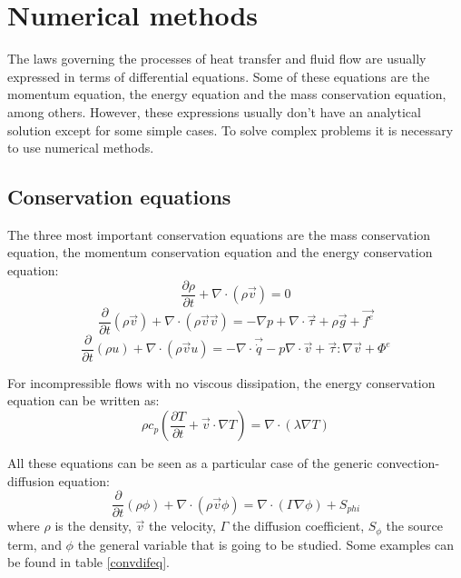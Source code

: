 \chapter{Numerical methods}

The laws governing the processes of heat transfer and fluid flow are usually expressed in terms of differential equations. Some of these equations are the momentum equation, the energy equation and the mass conservation equation, among others. However, these expressions usually don’t have an analytical solution except for some simple cases. To solve complex problems it is necessary to use numerical methods.

\section{Conservation equations}
The three most important conservation equations are the mass conservation equation, the momentum conservation equation and the energy conservation equation:
\begin{equation}
\frac{\partial\rho}{\partial t}+\nabla\cdot\left(\rho\vec{v}\right)=0
\end{equation}
\begin{equation}
\frac{\partial}{\partial t}\left(\rho\vec{v}\right)+\nabla\cdot\left(\rho\vec{v}\vec{v}\right)=-\nabla p+\nabla\cdot\vec{\tau}+\rho\vec{g}+\vec{f^{e}}
\end{equation}
\begin{equation}
\frac{\partial}{\partial t}(\rho u)+\nabla\cdot\left(\rho\vec{v}u\right)=-\nabla\cdot\vec{\dot{q}}-p\nabla\cdot\vec{v}+\vec{\tau}:\nabla\vec{v}+\Phi^{e}
\end{equation}

For incompressible flows with no viscous dissipation, the energy conservation equation can be written as:
\begin{equation}
\rho c_{p}\left(\frac{\partial T}{\partial t}+\vec{v}\cdot\nabla T\right)=\nabla\cdot\left(\lambda\nabla T\right)
\end{equation}

All these equations can be seen as a particular case of the generic convection-diffusion equation:
\begin{equation}
\frac{\partial}{\partial t}\left(\rho\phi\right)+\nabla\cdot\left(\rho\vec{v}\phi\right)=\nabla\cdot\left(\Gamma\nabla\phi\right)+S_{phi}
\end{equation}
where $\rho$ is the density, $\vec{v}$ the velocity, $\Gamma$ the diffusion coefficient, $S_{\phi}$ the source term, and $\phi$ the general variable that is going to be studied. Some examples can be found in table \ref{convdifeq}.

